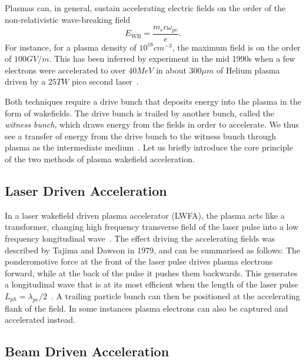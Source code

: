 Plasmas can, in general, sustain accelerating electric fields on the order of the non-relativistic wave-breaking field~\cite{dawson:1959, esarey:1996}
\begin{equation}
    E_{\mathrm{WB}} = \frac{m_{e} c \omega_{pe}}{e}. \label{EQ:EWB}
\end{equation}
For instance, for a plasma density of $10^{18}\unit{cm}^{-3}$, the maximum field is on the order of $100\unit{GV/m}$.
This has been inferred by experiment in the mid 1990s when a few electrons were accelerated to over $40\unit{MeV}$ in about $300\unit{\mu m}$ of Helium plasma driven by a $25\unit{TW}$ pico second laser~\cite{modena:1995}.

Both techniques require a drive bunch that deposits energy into the plasma in the form of wakefields.
The drive bunch is trailed by another bunch, called the \textit{witness bunch}, which draws energy from the fields in order to accelerate.
We thus see a transfer of energy from the drive bunch to the witness bunch through plasma as the intermediate medium~\cite{muggli:2009}.
Let us briefly introduce the core principle of the two methods of plasma wakefield acceleration. 

\subsection{Laser Driven Acceleration}
\label{Int:LWFA}

In a laser wakefield driven plasma accelerator (LWFA), the plasma acts like a transformer, changing high frequency transverse field of the laser pulse into a low frequency longitudinal wave~\cite{malka:2009}.
The effect driving the accelerating fields was described by Tajima and Dawson in 1979, and can be summarised as follows:
The ponderomotive force at the front of the laser pulse drives plasma electrons forward, while at the back of the pulse it pushes them backwards.
This generates a longitudinal wave that is at its most efficient when the length of the laser pulse $L_{ph} = \lambda_{pe}/2$~\cite{tajima:1979}.
A trailing particle bunch can then be positioned at the accelerating flank of the field.
In some instances plasma electrons can also be captured and accelerated instead.

\subsection{Beam Driven Acceleration}
\label{Int:BDPWFA}

